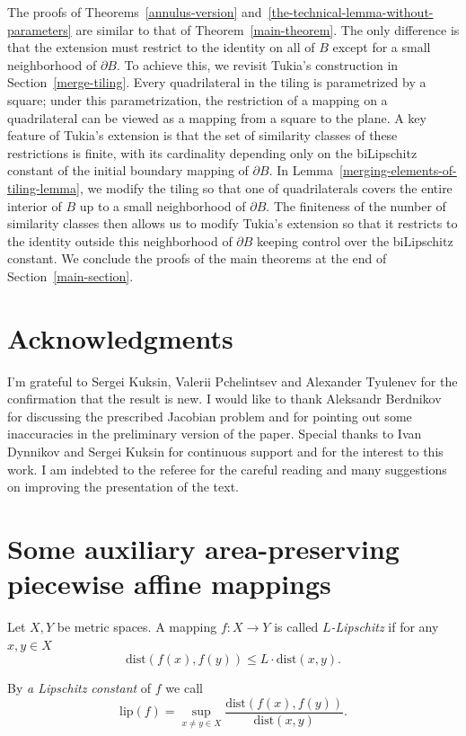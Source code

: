 \documentclass[12pt]{article}
\theoremstyle{definition}
\begin{document}
The proofs of Theorems~\ref{annulus-version} and~\ref{the-technical-lemma-without-parameters} are similar to that of Theorem~\ref{main-theorem}. The only difference is that the extension must restrict to the identity on all of $B$ except for a small neighborhood of $\partial B.$ To achieve this, we revisit Tukia's construction in Section~\ref{merge-tiling}. Every quadrilateral in the tiling is parametrized by a square; under this parametrization, the restriction of a mapping on a quadrilateral can be viewed as a mapping from a square to the plane. A key feature of Tukia's extension is that the set of similarity classes of these restrictions is finite, with its cardinality depending only on the biLipschitz constant of the initial boundary mapping of $\partial B.$ In Lemma~\ref{merging-elements-of-tiling-lemma}, we modify the tiling so that one of quadrilaterals covers the entire interior of $B$ up to a small neighborhood of $\partial B.$ The finiteness of the number of similarity classes then allows us to modify Tukia's extension so that it restricts to the identity outside this neighborhood of $\partial B$ keeping control over the biLipschitz constant. We conclude the proofs of the main theorems at the end of Section~\ref{main-section}.


\section*{Acknowledgments}
I'm grateful to Sergei Kuksin, Valerii Pchelintsev and Alexander Tyulenev for the confirmation that the result is new. I would like to thank Aleksandr Berdnikov for discussing the prescribed Jacobian problem and for pointing out some inaccuracies in the preliminary version of the paper. Special thanks to Ivan Dynnikov and Sergei Kuksin for continuous support and for the interest to this work.
I am indebted to the referee for the careful reading and many suggestions on improving the presentation of the text.

\section{Some auxiliary area-preserving piecewise affine mappings}
\label{auxiliary-section}
Let $X, Y$ be metric spaces. A mapping $f:X\to Y$ is called {\it $L$-Lipschitz} if for any $x,y\in X$
$$
\mathrm{dist}(f(x), f(y)) \le L\cdot\mathrm{dist}(x,y).
$$

By {\it a Lipschitz constant} of $f$ we call
$$\mathrm{lip}(f) = \sup\limits_{x\neq y\in X}\frac{\mathrm{dist}(f(x),f(y))}{\mathrm{dist}(x,y)}.$$
\end{document}

